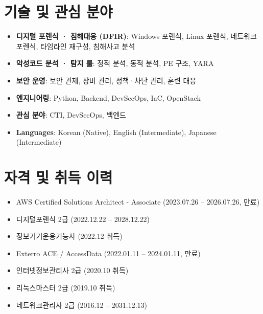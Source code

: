 \documentclass[letterpaper,11pt]{article}
\newcommand{\resumeItem}[1]{
  \item\small{{#1 \vspace{-2pt}}}
}
\newcommand{\resumeSkill}[2]{
  \item\small{\textbf{#1}: #2}
}
\newcommand{\resumeSubHeadingListStart}{\begin{itemize}[leftmargin=*]}
\newcommand{\resumeSubHeadingListEnd}{\end{itemize}}
\begin{document}
\section{기술 및 관심 분야}
  \resumeSubHeadingListStart
    \resumeSkill{디지털 포렌식 · 침해대응 (DFIR)}{Windows 포렌식, Linux 포렌식, 네트워크 포렌식, 타임라인 재구성, 침해사고 분석}
    \resumeSkill{악성코드 분석 · 탐지 룰}{정적 분석, 동적 분석, PE 구조, YARA}
    \resumeSkill{보안 운영}{보안 관제, 장비 관리, 정책·차단 관리, 훈련 대응}
    \resumeSkill{엔지니어링}{Python, Backend, DevSecOps, IaC, OpenStack}
    \resumeSkill{관심 분야}{CTI, DevSecOps, 백엔드}
    \resumeSkill{Languages}{Korean (Native), English (Intermediate), Japanese (Intermediate)}
  \resumeSubHeadingListEnd

\section{자격 및 취득 이력}
  \resumeSubHeadingListStart
    \resumeItem{AWS Certified Solutions Architect - Associate (2023.07.26 -- 2026.07.26, 만료)}
    \resumeItem{디지털포렌식 2급 (2022.12.22 -- 2028.12.22)}
    \resumeItem{정보기기운용기능사 (2022.12 취득)}
    \resumeItem{Exterro ACE / AccessData (2022.01.11 -- 2024.01.11, 만료)}
    \resumeItem{인터넷정보관리사 2급 (2020.10 취득)}
    \resumeItem{리눅스마스터 2급 (2019.10 취득)}
    \resumeItem{네트워크관리사 2급 (2016.12 -- 2031.12.13)}
  \resumeSubHeadingListEnd
\end{document}
